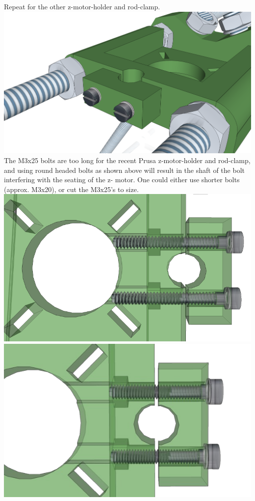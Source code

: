 \documentclass[twoside,a4paper,titlepage]{memoir}
\begin{document}
	\section{}
	Repeat for the other z-motor-holder and rod-clamp.\\
	\includegraphics[width=1\linewidth]{graphics/ch8_5_1.png}
	The M3x25 bolts are too long for the recent Prusa z-motor-holder and rod-clamp, and using round
	headed bolts as shown above will result in the shaft of the bolt interfering with the seating of the z-
	motor. One could either use shorter bolts (approx. M3x20), or cut the M3x25's to size.\\
	\includegraphics[width=1\linewidth]{graphics/ch8_5_2.png}	
	\includegraphics[width=1\linewidth]{graphics/ch8_5_3.png}	
\end{document}
